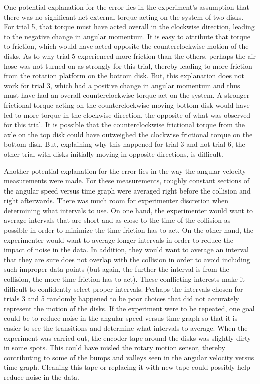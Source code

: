 \documentclass[12pt]{iopart} %
\begin{document}
One potential explanation for the error lies in the experiment's assumption that there was no significant net external torque acting on the system of two disks.
For trial 5, that torque must have acted overall in the clockwise direction, leading to the negative change in angular momentum.
It is easy to attribute that torque to friction, which would have acted opposite the counterclockwise motion of the disks.
As to why trial 5 experienced more friction than the others, perhaps the air hose was not turned on as strongly for this trial, thereby leading to more friction from the rotation platform on the bottom disk.
But, this explanation does not work for trial 3, which had a positive change in angular momentum and thus must have had an overall counterclockwise torque act on the system.
A stronger frictional torque acting on the counterclockwise moving bottom disk would have led to more torque in the clockwise direction, the opposite of what was observed for this trial.
It is possible that the counterclockwise frictional torque from the axle on the top disk could have outweighed the clockwise frictional torque on the bottom disk.
But, explaining why this happened for trial 3 and not trial 6, the other trial with disks initially moving in opposite directions, is difficult.

Another potential explanation for the error lies in the way the angular velocity measurements were made.
For these measurements, roughly constant sections of the angular speed versus time graph were averaged right before the collision and right afterwards.
There was much room for experimenter discretion when determining what intervals to use.
On one hand, the experimenter would want to average intervals that are short and as close to the time of the collision as possible in order to minimize the time friction has to act.
On the other hand, the experimenter would want to average longer intervals in order to reduce the impact of noise in the data.
In addition, they would want to average an interval that they are sure does not overlap with the collision in order to avoid including such improper data points (but again, the further the interval is from the collision, the more time friction has to act).
These conflicting interests make it difficult to confidently select proper intervals.
Perhaps the intervals chosen for trials 3 and 5 randomly happened to be poor choices that did not accurately represent the motion of the disks.
If the experiment were to be repeated, one goal could be to reduce noise in the angular speed versus time graph so that it is easier to see the transitions and determine what intervals to average.
When the experiment was carried out, the encoder tape around the disks was slightly dirty in some spots.
This could have misled the rotary motion sensor, thereby contributing to some of the bumps and valleys seen in the angular velocity versus time graph.
Cleaning this tape or replacing it with new tape could possibly help reduce noise in the data.
\end{document}
